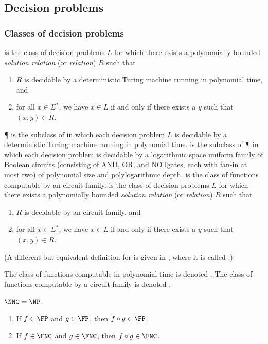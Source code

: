 \documentclass[]{article}
\newcommand{\AND}{\textsf{AND}}
\newcommand{\OR}{\textsf{OR}}
\newcommand{\NOT}{\textsf{NOT}}
\begin{document}
\subsection{Decision problems}

\subsubsection{Classes of decision problems}

\NP{} is the class of decision problems $L$ for which there exists a polynomially bounded \emph{solution relation} (or \emph{\NP{} relation}) $R$ such that
\begin{enumerate}
\item $R$ is decidable by a deterministic Turing machine running in polynomial time, and
\item for all $x \in \Sigma^*$, we have $x \in L$ if and only if there exists a $y$ such that $(x, y) \in R$.
\end{enumerate}
\P{} is the subclass of \NP{} in which each decision problem $L$ is decidable by a deterministic Turing machine running in polynomial time.
\NC{} is the subclass of \P{} in which each decision problem is decidable by a logarithmic space uniform family of Boolean circuits (consisting of \AND, \OR, and \NOT gates, each with fan-in at most two) of polynomial size and polylogarithmic depth.
\FNC{} is the class of functions computable by an \NC{} circuit family.
\NNC{} is the class of decision problems $L$ for which there exists a polynomially bounded \emph{solution relation} (or \emph{\NNC{} relation}) $R$ such that
\begin{enumerate}
\item $R$ is decidable by an \NC{} circuit family, and
\item for all $x \in \Sigma^*$, we have $x \in L$ if and only if there exists a $y$ such that $(x, y) \in R$.
\end{enumerate}
(A different but equivalent definition for \NNC{} is given in \cite{wolf94}, where it is called \NNCpoly.)

The class of functions computable in polynomial time is denoted \FP.
The class of functions computable by a \NC{} circuit family is denoted \FNC.

\begin{theorem}\label{thm:nncequalsnp}
  $\NNC = \NP$.
\end{theorem}

\begin{lemma}
  \mbox{}
  \begin{enumerate}
  \item If $f \in \FP$ and $g \in \FP$, then $f \circ g \in \FP$.
  \item If $f \in \FNC$ and $g \in \FNC$, then $f \circ g \in \FNC$.
  \end{enumerate}
\end{lemma}
\end{document}

